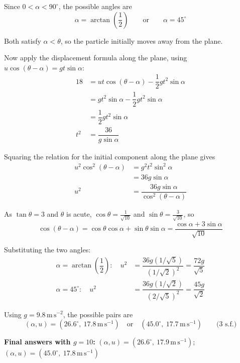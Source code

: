 \documentclass[leqno]{article}
\begin{document}
\begin{enumerate}[
  label=\textbf{\arabic*.},
  leftmargin=*,
  topsep=0pt,
  partopsep=0pt,
  parsep=0pt
]
\begin{djsSolution}
Since \(0<\alpha<90^\circ\), the possible angles are
\[
\alpha=\arctan\left(\dfrac12\right)\qquad\text{or}\qquad\alpha=45^\circ
\]

Both satisfy \(\alpha<\theta\), so the particle initially moves away from the plane.

Now apply the displacement formula along the plane, using \(u\cos(\theta-\alpha)=gt\sin\alpha\):
\begin{align*}
18&=ut\cos(\theta-\alpha)-\dfrac12gt^2\sin\alpha\\
&=gt^2\sin\alpha-\dfrac12gt^2\sin\alpha\\
&=\dfrac12gt^2\sin\alpha\\
t^2&=\dfrac{36}{g\sin\alpha}
\end{align*}

Squaring the relation for the initial component along the plane gives
\begin{align*}
u^2\cos^2(\theta-\alpha)&=g^2t^2\sin^2\alpha\\
&=36g\sin\alpha\\
u^2&=\dfrac{36g\sin\alpha}{\cos^2(\theta-\alpha)}
\end{align*}

As \(\tan\theta=3\) and \(\theta\) is acute, \(\cos\theta=\frac{1}{\sqrt{10}}\) and \(\sin\theta=\frac{3}{\sqrt{10}}\), so
\[
\cos(\theta-\alpha)=\cos\theta\cos\alpha+\sin\theta\sin\alpha
=\dfrac{\cos\alpha+3\sin\alpha}{\sqrt{10}}
\]

Substituting the two angles:
\begin{align*}
\alpha=\arctan\left(\dfrac12\right):\quad
u^2&=\dfrac{36g(1/\sqrt5)}{(1/\sqrt2)^2}
=\dfrac{72g}{\sqrt5}\\
\alpha=45^\circ:\quad
u^2&=\dfrac{36g(1/\sqrt2)}{(2/\sqrt5)^2}
=\dfrac{45g}{\sqrt2}
\end{align*}

Using \(g=9.8\,\mathrm{m\,s^{-2}}\), the possible pairs are
\[
(\alpha,u)=(26.6^\circ,\ 17.8\,\mathrm{m\,s^{-1}})
\quad\text{or}\quad
(45.0^\circ,\ 17.7\,\mathrm{m\,s^{-1}})
\qquad\text{(3 s.f.)}
\]

\par\medskip\noindent\textbf{Final answers with \(g = 10\):} \((\alpha,u)=(26.6^\circ,\ 17.9\,\mathrm{m\,s^{-1}})\);\quad \((\alpha,u)=(45.0^\circ,\ 17.8\,\mathrm{m\,s^{-1}})\)
\end{djsSolution}

\newpage

\questionitem


\end{enumerate}
\end{document}
